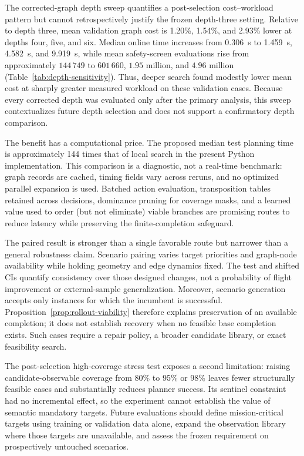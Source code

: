 \documentclass{IEEEtaes}
\newcommand{\unit}[2]{#1~#2}
\theoremstyle{remark}
\theoremstyle{plain}
\begin{document}
The corrected-graph depth sweep quantifies a post-selection cost--workload pattern but cannot retrospectively justify the frozen depth-three setting. Relative to depth three, mean validation graph cost is 1.20\%, 1.54\%, and 2.93\% lower at depths four, five, and six. Median online time increases from \unit{0.306}{s} to \unit{1.459}{s}, \unit{4.582}{s}, and \unit{9.919}{s}, while mean safety-screen evaluations rise from approximately $144\,749$ to $601\,660$, $1.95$ million, and $4.96$ million (Table~\ref{tab:depth-sensitivity}). Thus, deeper search found modestly lower mean cost at sharply greater measured workload on these validation cases. Because every corrected depth was evaluated only after the primary analysis, this sweep contextualizes future depth selection and does not support a confirmatory depth comparison.

The benefit has a computational price. The proposed median test planning time is approximately 144 times that of local search in the present Python implementation. This comparison is a diagnostic, not a real-time benchmark: graph records are cached, timing fields vary across reruns, and no optimized parallel expansion is used. Batched action evaluation, transposition tables retained across decisions, dominance pruning for coverage masks, and a learned value used to order (but not eliminate) viable branches are promising routes to reduce latency while preserving the finite-completion safeguard.

The paired result is stronger than a single favorable route but narrower than a general robustness claim. Scenario pairing varies target priorities and graph-node availability while holding geometry and edge dynamics fixed. The test and shifted CIs quantify consistency over those designed changes, not a probability of flight improvement or external-sample generalization. Moreover, scenario generation accepts only instances for which the incumbent is successful. Proposition~\ref{prop:rollout-viability} therefore explains preservation of an available completion; it does not establish recovery when no feasible base completion exists. Such cases require a repair policy, a broader candidate library, or exact feasibility search.

The post-selection high-coverage stress test exposes a second limitation: raising candidate-observable coverage from 80\% to 95\% or 98\% leaves fewer structurally feasible cases and substantially reduces planner success. Its sentinel constraint had no incremental effect, so the experiment cannot establish the value of semantic mandatory targets. Future evaluations should define mission-critical targets using training or validation data alone, expand the observation library where those targets are unavailable, and assess the frozen requirement on prospectively untouched scenarios.
\end{document}
